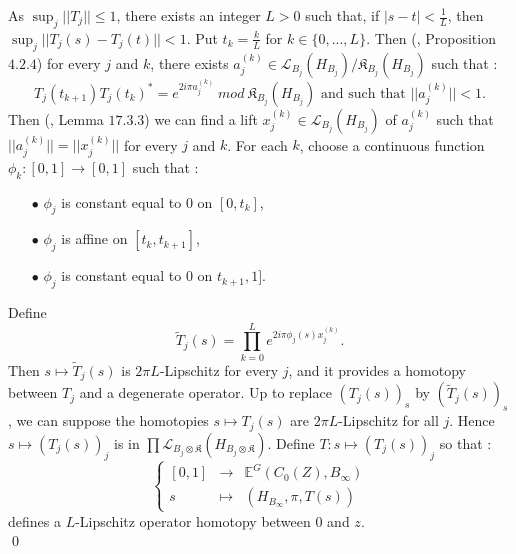 \begin{dem}
As $\sup_j ||T_j||\leq 1$, there exists an integer $L>0$ such that, if $|s-t|<\frac{1}{L}$, then $\sup_j ||T_j(s)-T_j(t)||< 1$. Put $t_k=\frac{k}{L}$ for $k\in\{0,..., L\}$. Then (\cite{WeggeOlsen}, Proposition $4.2.4$) for every $j$ and $k$, there exists $a_j^{(k)}\in \mathcal L_{B_j}(H_{B_j})/ {\mathfrak K}_{B_j}(H_{B_j})$ such that :
\[T_j(t_{k+1})T_j(t_{k})^*=e^{2i\pi a_j^{(k)}} \ mod \ {\mathfrak K}_{B_j}(H_{B_j}) \text{ and such that } ||a_j^{(k)}||<1.\] 
Then (\cite{WeggeOlsen}, Lemma $17.3.3$) we can find a lift $x_j^{(k)}\in  \mathcal L_{B_j}(H_{B_j})$ of $a_j^{(k)}$ such that $||a_j^{(k)}||= ||x_j^{(k)}||$ for every $j$ and $k$. For each $k$, choose a continuous function $\phi_k : [0,1]\rightarrow [0,1]$ such that :
\begin{itemize}
\item[$\bullet$] $\phi_j $ is constant equal to $0$ on $[0,t_k ]$,
\item[$\bullet$] $\phi_j$ is affine on $[t_k,t_{k+1}]$,
\item[$\bullet$] $\phi_j $ is constant equal to $0$ on $t_{k+1},1 ]$.
\end{itemize}
Define \[\tilde T_j(s) = \prod_{k=0}^{L} e^{2i\pi \phi_j(s) x_j^{(k)}}.\] 
Then $s\mapsto \tilde T_j(s)$ is $2\pi L$-Lipschitz for every $j$, and it provides a homotopy between $T_j$ and a degenerate operator. Up to replace $(T_j(s))_s$ by $(\tilde T_j(s))_s$, we can suppose the homotopies $s\mapsto T_j(s)$ are $2\pi L$-Lipschitz for all $j$. Hence $s\mapsto (T_j(s))_j$ is in $\prod\mathcal L_{B_j\otimes \mathfrak K}(H_{B_j\otimes \mathfrak K}) $. Define $T : s\mapsto (T_j(s))_j$ so that :
\[\left\{\begin{array}{rcl} [0,1] & \rightarrow & \mathbb E^G(C_0(Z),B_\infty)\\ s & \mapsto & (H_{B_\infty}, \pi,T(s))\end{array}\right.\]
defines a $L$-Lipschitz operator homotopy between $0$ and $z$.\\

\qed
\end{dem}
